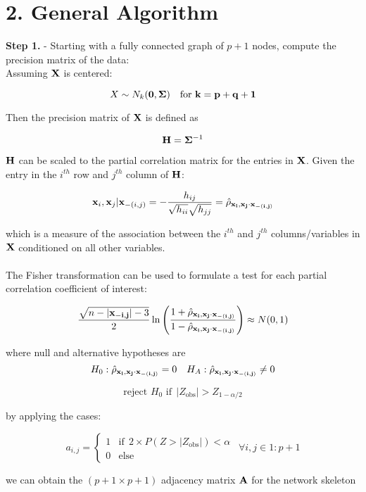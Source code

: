 \documentclass[12pt]{report}
\begin{document}
\section*{2. General Algorithm}

\textbf{Step 1.} - Starting with a fully connected graph of $p+1$ nodes, compute the precision matrix of the data: \\
Assuming $\bf X$ is centered:

\[ X \sim N_k({\bf 0}, \bf{\Sigma})  \ \ \ \text{for} \ k=p+q+1\]
 
Then the precision matrix of $\bf X$ is defined as 

\[  {\bf H} = {\bf \Sigma}^{-1} \]

$\bf H$ can be scaled to the partial correlation matrix for the entries in $\bf X$. Given the entry in the $i^{th}$ row and $j^{th}$ column of $\bf H$:

\[  {\bf x}_i, {\bf x}_j | {\bf x}_{-(i,j)} = - \frac{h_{ij}}{\sqrt{h_{ii}}\sqrt{h_{jj}}} = \hat{\rho}_{\bf x_i,x_j\cdot x_{ -(i,j)}  }\]

which is a measure of the association between the $i^{th}$ and $j^{th}$ columns/variables in $\bf X$ conditioned on all other variables. \\
\\
The Fisher transformation can be used to formulate a test for each partial correlation coefficient of interest:

\[ \frac{\sqrt{n - |{\bf x_{-i,j}}| -3}}{2}\ln\left( \frac{1+\hat{\rho}_{\bf x_i,x_j\cdot x_{ -(i,j)}  }}{1-\hat{\rho}_{\bf x_i,x_j\cdot x_{ -(i,j)}  }} \right)  \approx N(0,1)\]

where null and alternative hypotheses are 
\[ H_0:  \hat{\rho}_{\bf x_i,x_j\cdot x_{ -(i,j)}  } = 0 \ \ \ H_A: \hat{\rho}_{\bf x_i,x_j\cdot x_{ -(i,j)}  }\neq 0\]

\[  \text{reject $H_0$ if} \ \  | Z_{\text{obs}}| > Z_{1-\alpha/2 }\]

by applying the cases:

\[  a_{i,j} = \begin{cases}1 & \text{if} \ \ 2\times P(Z>|Z_{\text{obs}}|)<\alpha \\
                                      0 & \text{else} 
  \end{cases} \ \ \forall i,j \in 1:p+1\]

we can obtain the $(p+1 \times p+1)$ adjacency matrix $\bf A$ for the network skeleton\\
\end{document}
